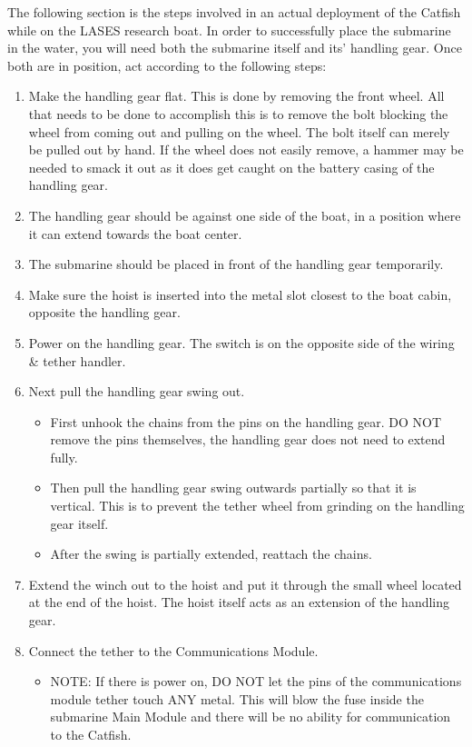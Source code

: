 \documentclass[
18pt, %
a4paper, %
oneside, %
headinclude,footinclude, %
]{scrartcl}
\begin{document}
The following section is the steps involved in an actual deployment of the Catfish while on the LASES research boat. In order to successfully place the submarine in the water, you will need both the submarine itself and its' handling gear. Once both are in position, act according to the following steps:

\begin{enumerate}
	\item Make the handling gear flat. This is done by removing the front wheel. All that needs to be done to accomplish this is to remove the bolt blocking the wheel from coming out and pulling on the wheel. The bolt itself can merely be pulled out by hand. If the wheel does not easily remove, a hammer may be needed to smack it out as it does get caught on the battery casing of the handling gear.
	\item The handling gear should be against one side of the boat, in a position where it can extend towards the boat center.
	\item The submarine should be placed in front of the handling gear temporarily.
	\item Make sure the hoist is inserted into the metal slot closest to the boat cabin, opposite the handling gear.
	\item Power on the handling gear. The switch is on the opposite side of the wiring \& tether handler.
		\item Next pull the handling gear swing out.
	\begin{itemize}
		\item First unhook the chains from the pins on the handling gear. DO NOT remove the pins themselves, the handling gear does not need to extend fully.
		\item Then pull the handling gear swing outwards partially so that it is vertical. This is to prevent the tether wheel from grinding on the handling gear itself.
		\item After the swing is partially extended, reattach the chains.
	\end{itemize}	
	\item Extend the winch out to the hoist and put it through the small wheel located at the end of the hoist. The hoist itself acts as an extension of the handling gear.	
	\item Connect the tether to the Communications Module. 
	\begin{itemize}
		\item NOTE: If there is power on, DO NOT let the pins of the communications module tether touch ANY metal. This will blow the fuse inside the submarine Main Module and there will be no ability for communication to the Catfish.

\end{itemize}
\end{enumerate}
\end{document}
